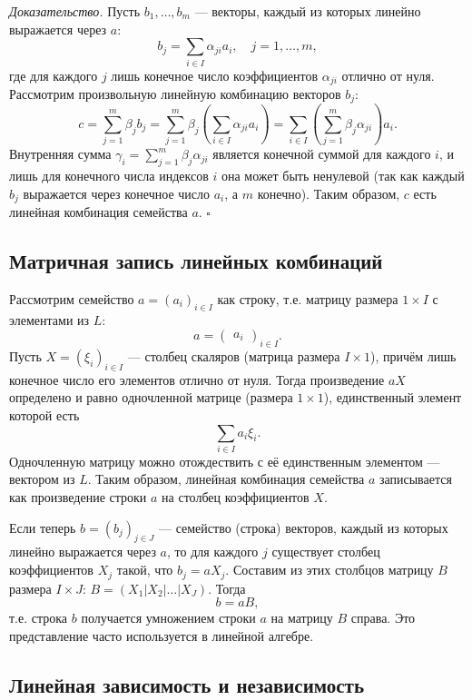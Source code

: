 \documentclass[a4paper,12pt]{article}
\theoremstyle{definition}
\theoremstyle{plain}
\theoremstyle{remark}
\begin{document}
	\medskip
	\textit{Доказательство.}
	Пусть \( b_1, \dots, b_m \) — векторы, каждый из которых линейно выражается через \( a \):
	\[
	b_j = \sum_{i \in I} \alpha_{ji} a_i, \quad j = 1, \dots, m,
	\]
	где для каждого \( j \) лишь конечное число коэффициентов \( \alpha_{ji} \) отлично от нуля. Рассмотрим произвольную линейную комбинацию векторов \( b_j \):
	\[
	c = \sum_{j=1}^m \beta_j b_j = \sum_{j=1}^m \beta_j \left( \sum_{i \in I} \alpha_{ji} a_i \right) = \sum_{i \in I} \left( \sum_{j=1}^m \beta_j \alpha_{ji} \right) a_i.
	\]
	Внутренняя сумма \( \gamma_i = \sum_{j=1}^m \beta_j \alpha_{ji} \) является конечной суммой для каждого \( i \), и лишь для конечного числа индексов \( i \) она может быть ненулевой (так как каждый \( b_j \) выражается через конечное число \( a_i \), а \( m \) конечно). Таким образом, \( c \) есть линейная комбинация семейства \( a \). \hfill \(\square\)
	
	\subsection{Матричная запись линейных комбинаций}
	
	Рассмотрим семейство \( a = (a_i)_{i \in I} \) как строку, т.е. матрицу размера \( 1 \times I \) с элементами из \( L \):
	\[
	a = \begin{pmatrix} a_i \end{pmatrix}_{i \in I}.
	\]
	Пусть \( X = (\xi_i)_{i \in I} \) — столбец скаляров (матрица размера \( I \times 1 \)), причём лишь конечное число его элементов отлично от нуля. Тогда произведение \( aX \) определено и равно одночленной матрице (размера \( 1 \times 1 \)), единственный элемент которой есть
	\[
	\sum_{i \in I} a_i \xi_i.
	\]
	Одночленную матрицу можно отождествить с её единственным элементом — вектором из \( L \). Таким образом, линейная комбинация семейства \( a \) записывается как произведение строки \( a \) на столбец коэффициентов \( X \).
	
	Если теперь \( b = (b_j)_{j \in J} \) — семейство (строка) векторов, каждый из которых линейно выражается через \( a \), то для каждого \( j \) существует столбец коэффициентов \( X_j \) такой, что \( b_j = a X_j \). Составим из этих столбцов матрицу \( B \) размера \( I \times J \): \( B = (X_1 | X_2 | \dots | X_J) \). Тогда
	\[
	b = a B,
	\]
	т.е. строка \( b \) получается умножением строки \( a \) на матрицу \( B \) справа. Это представление часто используется в линейной алгебре.
	
	\subsection{Линейная зависимость и независимость}
	
\end{document}

